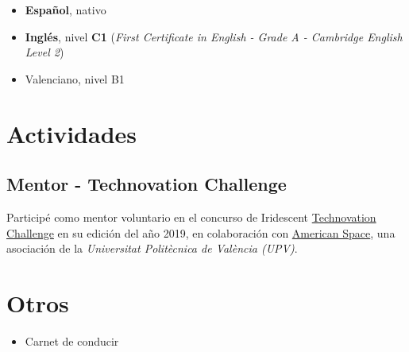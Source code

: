 \documentclass[letterpaper, 12pt, dvipsnames]{article}
\newcommand{\uni}{{\uniFull} ({\uniShort})}
\newcommand{\uniFull}{Universitat Politècnica de València}
\newcommand{\uniShort}{UPV}
\newcommand{\fce}{\emph{First Certificate in English - Grade A - Cambridge English Level 2}}
\begin{document}
\begin{itemize}
    \item \textbf{Español}, nativo
    \item \textbf{Inglés}, nivel \textbf{C1} (\fce)
    \item Valenciano, nivel B1
\end{itemize}

\section*{Actividades}

\subsection*{Mentor - Technovation Challenge}

Participé como mentor voluntario en el concurso de Iridescent \href{https://technovationchallenge.org/}{Technovation Challenge} en su edición del año 2019, en colaboración con \href{https://cdl.upv.es/american-space}{American Space}, una asociación de la \emph{\uni}.

\section*{Otros}

\begin{itemize}
    \item Carnet de conducir
\end{itemize}
\end{document}
